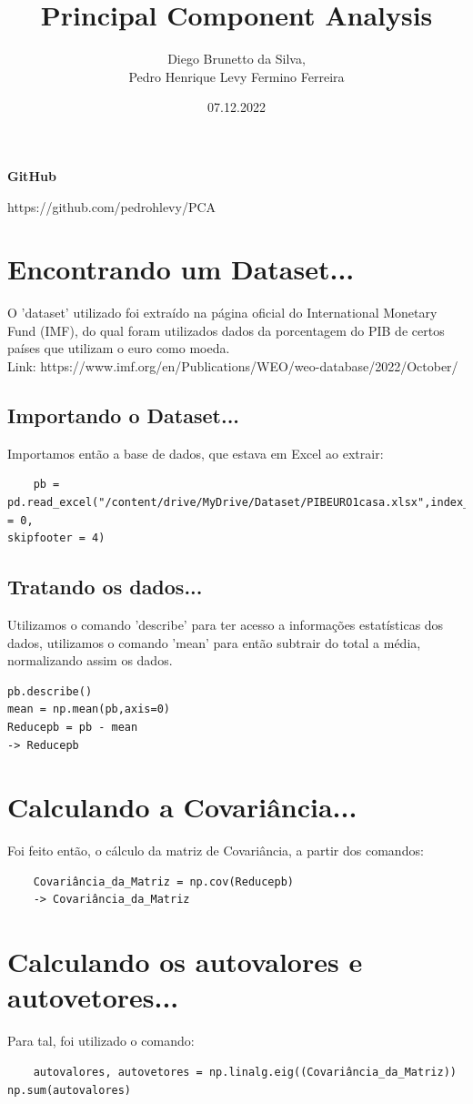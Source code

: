 \documentclass{article}
\title{Principal Component Analysis}
\author{Diego Brunetto da Silva,\\Pedro Henrique Levy Fermino Ferreira}
\date{07.12.2022}
\begin{document}
\maketitle
\textbf{GitHub}
\par
https://github.com/pedrohlevy/PCA
\section{Encontrando um Dataset...}
\par

O 'dataset' utilizado foi extraído na página oficial do International Monetary Fund (IMF), do qual foram utilizados dados da porcentagem do PIB de certos países que utilizam o euro como moeda. \\
Link: https://www.imf.org/en/Publications/WEO/weo-database/2022/October/

\subsection{Importando o Dataset...}
Importamos então a base de dados, que estava em Excel ao extrair:
\begin{verbatim}
    pb = pd.read_excel("/content/drive/MyDrive/Dataset/PIBEURO1casa.xlsx",index_col = 0,
skipfooter = 4)
\end{verbatim}
\subsection{Tratando os dados...}
\par
Utilizamos o comando 'describe' para ter acesso a informações estatísticas dos dados, utilizamos o comando 'mean' para então subtrair do total a média, normalizando assim os dados.
\begin{verbatim}
pb.describe()
mean = np.mean(pb,axis=0)
Reducepb = pb - mean
-> Reducepb
\end{verbatim}
\section{Calculando a Covariância...}
\par
Foi feito então, o cálculo da matriz de Covariância, a partir dos comandos:
\begin{verbatim}
    Covariância_da_Matriz = np.cov(Reducepb)
    -> Covariância_da_Matriz	
\end{verbatim}
\section{Calculando os autovalores e autovetores...}
\par
Para tal, foi utilizado o comando:
\begin{verbatim}
    autovalores, autovetores = np.linalg.eig((Covariância_da_Matriz))
np.sum(autovalores)
\end{verbatim}
\end{document}
